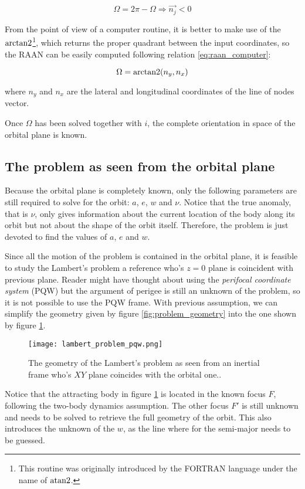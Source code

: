 \begin{equation}
  \Omega = 2\pi - \Omega \Rightarrow \vec{n_{j}} < 0
  \label{eq:raan_correction}
\end{equation}

From the point of view of a computer routine, it is better to make use of the
$\operatorname{arctan2}$\footnote{This routine was originally introduced by the FORTRAN
  language under the name of $\operatorname{atan2}$.}, which returns the proper quadrant
between the input coordinates, so the RAAN can be easily computed following
relation \ref{eq:raan_computer}:

\begin{equation}
  \Omega = \operatorname{arctan2}(n_{y}, n_{x})
  \label{eq:raan_computer}
\end{equation}

where $n_{y}$ and $n_{x}$ are the lateral and longitudinal coordinates of the
line of nodes vector.

Once $\Omega$ has been solved together with $i$, the complete orientation in
space of the orbital plane is known.

\subsection{The problem as seen from the orbital plane}

Because the orbital plane is completely known, only the following parameters are
still required to solve for the orbit: $a$, $e$, $w$ and $\nu$. Notice that the
true anomaly, that is $\nu$, only gives information about the current location
of the body along its orbit but not about the shape of the orbit itself.
Therefore, the problem is just devoted to find the values of $a$, $e$ and $w$.

Since all the motion of the problem is contained in the orbital plane, it is
feasible to study the Lambert's problem a reference who's $z=0$ plane is
coincident with previous plane. Reader might have thought about using the
\textit{perifocal coordinate system} (PQW) but the argument of perigee is still
an unknown of the problem, so it is not possible to use the PQW frame. With
previous assumption, we can simplify the geometry given by figure
\ref{fig:problem_geometry} into the one shown by figure
\ref{fig:lambert_problem_pqw}.

\vspace{0.15cm}
\begin{figure}[H]
  \centering
  \texttt{[image: lambert\_problem\_pqw.png]}
  \caption{
    The geometry of the Lambert's problem as seen from an inertial frame who's
    $XY$ plane coincides with the orbital one..
  }
  \label{fig:lambert_problem_pqw}
\end{figure}

Notice that the attracting body in figure \ref{fig:lambert_problem_pqw} is
located in the known focus $F$, following the two-body dynamics assumption. The
other focus $F'$ is still unknown and needs to be solved to retrieve the full
geometry of the orbit. This also introduces the unknown of the $w$, as the line
where for the semi-major needs to be guessed.


